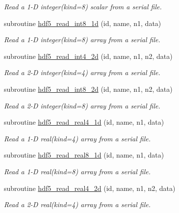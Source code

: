 \begin{DoxyCompactItemize}
\begin{DoxyCompactList}\small\item\em Read a 1-\/\-D integer(kind=8) scalar from a serial file. \end{DoxyCompactList}\item 
subroutine \hyperlink{classmodhdf5_a640df6ccea7f28d6ed6b578d8018d7d7}{hdf5\-\_\-read\-\_\-int8\-\_\-1d} (id, name, n1, data)
\begin{DoxyCompactList}\small\item\em Read a 1-\/\-D integer(kind=8) array from a serial file. \end{DoxyCompactList}\item 
subroutine \hyperlink{classmodhdf5_a29f383042b1dc2b1fc1155af48fc98a3}{hdf5\-\_\-read\-\_\-int4\-\_\-2d} (id, name, n1, n2, data)
\begin{DoxyCompactList}\small\item\em Read a 2-\/\-D integer(kind=4) array from a serial file. \end{DoxyCompactList}\item 
subroutine \hyperlink{classmodhdf5_a4ac00fa4fbae4c8a8f936ee48292e114}{hdf5\-\_\-read\-\_\-int8\-\_\-2d} (id, name, n1, n2, data)
\begin{DoxyCompactList}\small\item\em Read a 2-\/\-D integer(kind=8) array from a serial file. \end{DoxyCompactList}\item 
subroutine \hyperlink{classmodhdf5_ae087ad5b47b31640a477e5056aaf97e9}{hdf5\-\_\-read\-\_\-real4\-\_\-1d} (id, name, n1, data)
\begin{DoxyCompactList}\small\item\em Read a 1-\/\-D real(kind=4) array from a serial file. \end{DoxyCompactList}\item 
subroutine \hyperlink{classmodhdf5_a584fb8f065f2c6675049794e856b5085}{hdf5\-\_\-read\-\_\-real8\-\_\-1d} (id, name, n1, data)
\begin{DoxyCompactList}\small\item\em Read a 1-\/\-D real(kind=8) array from a serial file. \end{DoxyCompactList}\item 
subroutine \hyperlink{classmodhdf5_a36acd2df481965d7cb9c1b312fdff7b0}{hdf5\-\_\-read\-\_\-real4\-\_\-2d} (id, name, n1, n2, data)
\begin{DoxyCompactList}\small\item\em Read a 2-\/\-D real(kind=4) array from a serial file. \end{DoxyCompactList}\item 

\end{DoxyCompactItemize}
